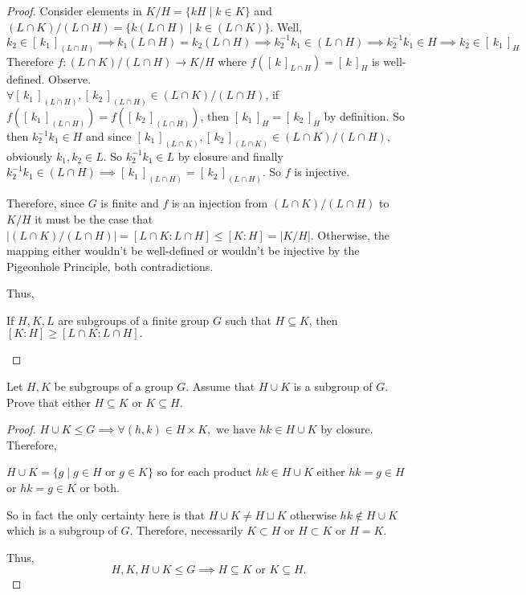 \documentclass[addpoints,10pt]{exam}
\theoremstyle{plain}
\theoremstyle{definition}
\newtheorem{prob}[thm]{Problem}
\theoremstyle{plain}
\theoremstyle{plain}
\theoremstyle{definition}
\let\oldprob\prob
\let\endoldprob\endprob
\renewenvironment{prob}
  {\begin{singlespace}\oldprob}
  {\endoldprob\end{singlespace}}
\newcommand{\belowtitle}{\leavevmode\newline}
\newcommand{\class}[2][]{\ensuremath{\left[\,#2\,\right]_{#1}}}
\begin{document}
\begin{proof}\belowtitle
  Consider elements in $K/H=\{kH\mid k\in K\}$ and $(L\cap K)/(L\cap H)=\{k(L\cap H)\mid k\in (L\cap K)\}$. Well,
    $$k_{2}\in \class[(L\cap H)]{k_{1}}\implies k_{1}(L\cap H)=k_{2}(L\cap H)\implies k_{2}^{-1}k_{1}\in (L\cap H)\implies k_{2}^{-1}k_{1}\in H\implies k_{2}\in \class[H]{k_{1}}$$
  Therefore $f:(L\cap K)/(L\cap H)\to K/H$ where $f(\class[L\cap H]{k})=\class[H]{k}$ is well-defined. Observe. \\

  $\forall \class[(L\cap H)]{k_{1}},\class[(L\cap H)]{k_{2}}\in (L\cap K)/(L\cap H)$, if $f(\class[(L\cap H)]{k_{1}})=f(\class[(L\cap H)]{k_{2}})$, then $\class[H]{k_{1}}=\class[H]{k_{2}}$ by definition. So then $k_{2}^{-1}k_{1}\in H$ and since $\class[(L\cap K)]{k_{1}},\class[(L\cap K)]{k_{2}}\in (L\cap K)/(L\cap H)$, obviously $k_{1},k_{2}\in L$. So $k_{2}^{-1}k_{1}\in L$ by closure and finally $k_{2}^{-1}k_{1}\in (L\cap H)\implies \class[(L\cap H)]{k_{1}}=\class[(L\cap H)]{k_{2}}$. So $f$ is injective.

  Therefore, since $G$ is finite and $f$ is an injection from $(L\cap K)/(L\cap H)$ to $K/H$ it must be the case that $|(L\cap K)/(L\cap H)|=[L\cap K:L\cap H]\leq [K:H]=|K/H|$. Otherwise, the mapping either wouldn't be well-defined or wouldn't be injective by the Pigeonhole Principle, both contradictions.

  Thus,
  \begin{center}
    If $H,K,L$ are subgroups of a finite group $G$ such that $H\subseteq K$, then $[K:H] \ge [L\cap K : L\cap H].$
  \end{center}



\end{proof}
\newpage
\begin{prob}
  Let $H,K$ be subgroups of a group $G$. Assume that $H\cup K$ is a subgroup of $G$. Prove that either $H\subseteq K$ or $K\subseteq H$.
\end{prob}

\begin{proof}
  $H\cup K\leq G\implies \forall (h,k)\in H\times K,\text{ we have }hk\in H\cup K$ by closure. Therefore,
  \begin{center} 
    $H\cup K=\{g\mid g\in H\text{ or }g\in K\}$ so for each product $hk\in H\cup K$ either $hk=g\in H$ or $hk=g\in K$ or both.
  \end{center}
  So in fact the only certainty here is that $H\cup K\neq H\sqcup K$ otherwise $hk\notin H\cup K$ which is a subgroup of $G$. Therefore, necessarily $K\subset H$ or $H\subset K$ or $H=K$.

  Thus,
  $$H,K,H\cup K\leq G\implies H\subseteq K\text{ or }K\subseteq H.$$
\end{proof}
\end{document}
